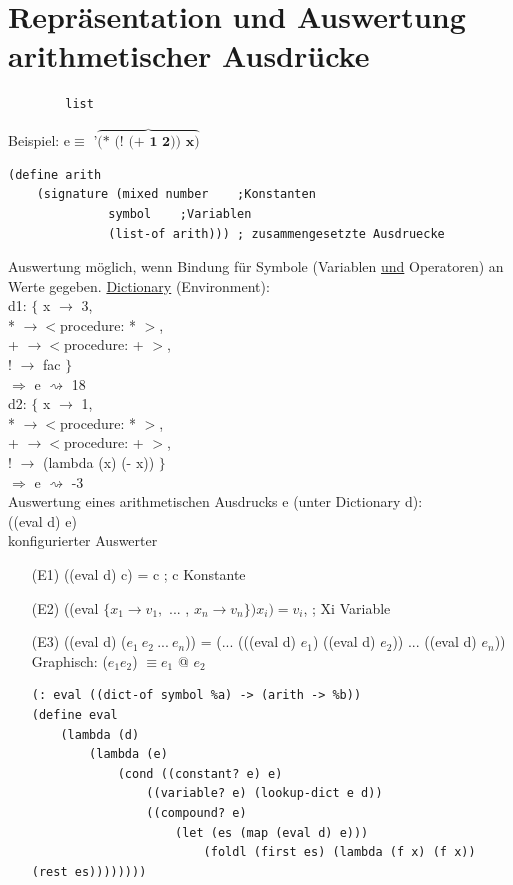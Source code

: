 \documentclass[a4paper, 20pt, openany]{book}
\begin{document}
\section{Repräsentation und Auswertung arithmetischer Ausdrücke}
\begin{lstlisting}
		list
\end{lstlisting}
Beispiel: e$\equiv$ '$\overbrace{\textbf{(* (! (+ 1 2)) x)}}$

\begin{lstlisting}
(define arith
	(signature (mixed number 	;Konstanten
			  symbol 	;Variablen
			  (list-of arith))) ; zusammengesetzte Ausdruecke
\end{lstlisting}
Auswertung möglich, wenn Bindung für Symbole (Variablen \underline{und} Operatoren) an Werte gegeben. \underline{Dictionary} (Environment):\\
d1: $\lbrace$ x $\rightarrow$ 3,\\
* $\rightarrow <$procedure: * $>$,\\
+ $\rightarrow <$procedure: + $>$,\\
! $\rightarrow$ fac $\rbrace$\\
$\Rightarrow$ e $\rightsquigarrow$ 18\\

d2: $\lbrace$ x $\rightarrow$ 1,\\
* $\rightarrow <$procedure: * $>$,\\
+ $\rightarrow <$procedure: + $>$,\\
! $\rightarrow$ (lambda (x) (- x)) $\rbrace$\\
$\Rightarrow$ e $\rightsquigarrow$ -3\\

Auswertung eines arithmetischen Ausdrucks e (unter Dictionary d):\\
 ((eval d) e)\\
 konfigurierter Auswerter
 \begin{enumerate}
 \item[(E1)] ((eval d) c) = c ; c Konstante
 \item[(E2)] ((eval $\lbrace x_1 \rightarrow v_1,$ ... , $x_n \rightarrow v_n \rbrace) x_i) = v_i$, ; Xi Variable
 \item[(E3)] ((eval d) ($e_1 \ e_2 \ ... \ e_n$)) = (... (((eval d) $e_1$) ((eval d) $e_2$)) ... ((eval d) $e_n$))\\
 Graphisch: ($e_1 e_2$) $\equiv e_1$ @ $e_2$\\
\begin{lstlisting}
(: eval ((dict-of symbol %a) -> (arith -> %b))
(define eval
	(lambda (d)
		(lambda (e)
			(cond ((constant? e) e)
				((variable? e) (lookup-dict e d))
				((compound? e)
					(let (es (map (eval d) e)))
						(foldl (first es) (lambda (f x) (f x)) (rest es))))))))
\end{lstlisting} 
\end{enumerate}
 
\end{document}
